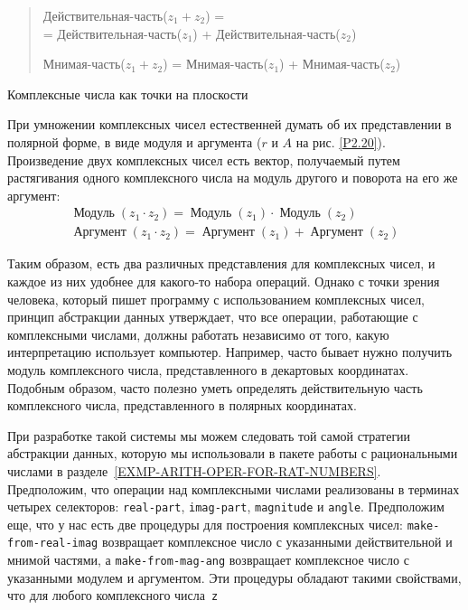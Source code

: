 \begin{quote}
Действительная-часть($z_1 + z_2$) = \\
= Действительная-часть($z_1$) + Действительная-часть($z_2$) 

Мнимая-часть($z_1 + z_2$) = Мнимая-часть($z_1$) + Мнимая-часть($z_2$)
\end{quote}					


\begin{cntrfig}

\caption{Комплексные числа как точки на плоскости} 
\label{P2.20}
\end{cntrfig}

При умножении комплексных чисел естественней думать об их
представлении в полярной форме, в виде модуля и аргумента ($r$
и $A$ на рис. \ref{P2.20}).  Произведение двух
комплексных чисел есть вектор, получаемый путем растягивания одного
комплексного числа на модуль другого и поворота на его же аргумент: 
$$
\begin{array}{l}
        \mathop{\mbox{Модуль}} (z_1 \cdot z_2) = \mathop{\mbox{Модуль}} (z_1)
                \cdot \mathop{\mbox{Модуль}} (z_2) \\
        \mathop{\mbox{Аргумент}} (z_1 \cdot z_2) = \mathop{\mbox{Аргумент}} (z_1)
                + \mathop{\mbox{Аргумент}} (z_2)
\end{array}
$$

Таким образом, есть два различных представления для
комплексных чисел, и каждое из них удобнее для какого-то набора
операций.  Однако с точки зрения человека, который пишет программу с
использованием комплексных чисел, принцип абстракции данных
утверждает, что все операции, работающие с комплексными числами, должны 
работать независимо от того, какую интерпретацию использует
компьютер.  Например, часто бывает нужно получить модуль комплексного
числа, представленного в декартовых координатах.  Подобным образом,
часто полезно уметь определять действительную часть комплексного
числа, представленного в полярных координатах.

При разработке такой системы мы можем следовать той самой
стратегии   абстракции данных, которую мы использовали в пакете работы с
рациональными числами в разделе~\ref{EXMP-ARITH-OPER-FOR-RAT-NUMBERS}.
Предположим, что операции над комплексными числами реализованы в
терминах четырех селекторов: {\tt real-part},
{\tt imag-part}, {\tt magnitude} и {\tt angle}.
Предположим еще, что у нас есть две процедуры для построения
комплексных чисел: {\tt make-from-real-imag} возвращает
комплексное число с указанными действительной и мнимой частями, а
{\tt make-from-mag-ang} возвращает комплексное число с
указанными модулем и аргументом.  Эти процедуры обладают такими
свойствами, что для любого комплексного числа~{\tt z}

